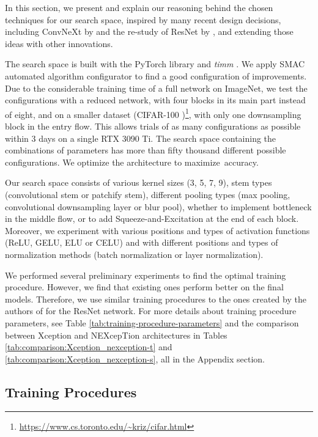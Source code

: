 In this section, we present and explain our reasoning behind the chosen techniques for our search space, inspired by many recent design decisions, including ConvNeXt by \citet{LiuEtAl2022} and the re-study of ResNet by \citet{WigEtAl2021}, and extending those ideas with other innovations.

The search space is built with the PyTorch library \citep{PasEtAl2019} and \textit{timm} \citep{Wightman2019}. We apply SMAC \citep{LindauerEtAl2022} automated algorithm configurator to find a good configuration of improvements. 
Due to the considerable training time of a full network on ImageNet, we test the configurations with a reduced network, with four blocks in its main part instead of eight, and on a smaller dataset (\mbox{CIFAR-100} \citep{KrizEtAl2009})\footnote{\url{https://www.cs.toronto.edu/~kriz/cifar.html}}, with only one downsampling block in the entry flow. 
This allows trials of as many configurations as possible within 3 days on a single RTX 3090 Ti. The search space containing the combinations of parameters has more than fifty thousand different possible configurations. We optimize the architecture to \mbox{maximize accuracy.}

Our search space consists of various kernel sizes (3, 5, 7, 9), stem types (convolutional stem or patchify stem), different pooling types (max pooling, convolutional downsampling layer or blur pool),  whether to implement bottleneck in the middle flow, or to add Squeeze-and-Excitation at the end of each block. Moreover, we experiment with various positions and types of activation functions (ReLU, GELU, ELU or CELU) and with different positions and types of normalization methods (batch normalization or layer normalization). 

We performed several preliminary experiments to find the optimal training procedure. However,
we find that existing ones perform better on the final models. Therefore, we use similar training procedures to the ones created by the authors of \citet{WigEtAl2021} for the ResNet network. For more details about training procedure parameters, see Table \ref{tab:training-procedure-parameters} and the comparison between Xception and NEXcepTion architectures in Tables \ref{tab:comparison:Xception_nexception-t} and \ref{tab:comparison:Xception_nexception-s}, all in the Appendix section.


\subsection{Training Procedures}

